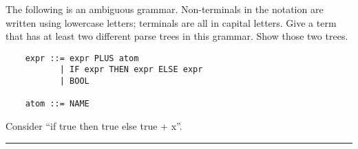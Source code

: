 \documentclass[addpoints]{exam}
\begin{document}
\begin{questions}
\begin{parts}
\begin{solutionbox}{7cm}
      {\small
      }
    \end{solutionbox}
  \end{parts}
  
  \question
  The following is an ambiguous grammar. 
  Non-terminals in the notation are written using
  lowercase letters;
  terminals are all in capital letters.
  Give a term that has at least two different parse trees
  in this grammar.
  Show those two trees.
  
  \begin{verbatim}
    expr ::= expr PLUS atom
           | IF expr THEN expr ELSE expr
           | BOOL

    atom ::= NAME
  \end{verbatim}

  \begin{solutionbox}{8.5cm}
    Consider ``if true then true else true + x''.

    {\small

      \hrule
      
    }
  \end{solutionbox}


\end{questions}
\end{document}
